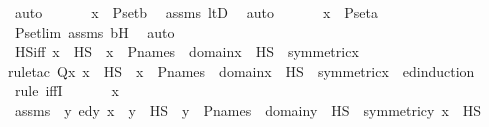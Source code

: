 \begin{isabellebody}
\ auto\ \isanewline
\ \ \isamarkupfalse%
\ \isamarkupfalse%
\ {\isachardoublequoteopen}x\ {\isasymin}\ P{\isacharunderscore}{\kern0pt}set{\isacharparenleft}{\kern0pt}b{\isacharparenright}{\kern0pt}{\isachardoublequoteclose}\ \isamarkupfalse%
\ assms\ ltD\ \isamarkupfalse%
\ auto\ \isanewline
\ \ \isamarkupfalse%
\ \isamarkupfalse%
\ {\isachardoublequoteopen}x\ {\isasymin}\ P{\isacharunderscore}{\kern0pt}set{\isacharparenleft}{\kern0pt}a{\isacharparenright}{\kern0pt}{\isachardoublequoteclose}\ \isamarkupfalse%
\ P{\isacharunderscore}{\kern0pt}set{\isacharunderscore}{\kern0pt}lim\ assms\ bH\ \isamarkupfalse%
\ auto\ \isanewline
{}\isamarkupfalse%
%
\endisatagproof
{\isafoldproof}%
%
\isadelimproof
\isanewline
%
\endisadelimproof
\isanewline
{}\isamarkupfalse%
\ HS{\isacharunderscore}{\kern0pt}iff{\isacharcolon}{\kern0pt}\ {\isachardoublequoteopen}x\ {\isasymin}\ HS\ {\isasymlongleftrightarrow}\ x\ {\isasymin}\ P{\isacharunderscore}{\kern0pt}names\ {\isasymand}\ domain{\isacharparenleft}{\kern0pt}x{\isacharparenright}{\kern0pt}\ {\isasymsubseteq}\ HS\ {\isasymand}\ symmetric{\isacharparenleft}{\kern0pt}x{\isacharparenright}{\kern0pt}{\isachardoublequoteclose}\ \isanewline
%
\isadelimproof
\ \ %
\endisadelimproof
%
\isatagproof
{}\isamarkupfalse%
{\isacharparenleft}{\kern0pt}rule{\isacharunderscore}{\kern0pt}tac\ Q{\isacharequal}{\kern0pt}{\isachardoublequoteopen}{\isasymlambda}x{\isachardot}{\kern0pt}\ x\ {\isasymin}\ HS\ {\isasymlongleftrightarrow}\ x\ {\isasymin}\ P{\isacharunderscore}{\kern0pt}names\ {\isasymand}\ domain{\isacharparenleft}{\kern0pt}x{\isacharparenright}{\kern0pt}\ {\isasymsubseteq}\ HS\ {\isasymand}\ symmetric{\isacharparenleft}{\kern0pt}x{\isacharparenright}{\kern0pt}{\isachardoublequoteclose}\ \ ed{\isacharunderscore}{\kern0pt}induction{\isacharparenright}{\kern0pt}\ \isanewline
\ \ \isamarkupfalse%
\ {\isacharparenleft}{\kern0pt}rule\ iffI{\isacharparenright}{\kern0pt}\isanewline
{}\isamarkupfalse%
\ {\isacharminus}{\kern0pt}\ \isanewline
\ \ \isamarkupfalse%
\ x\ \isamarkupfalse%
\ assms\ {\isacharcolon}{\kern0pt}\ {\isachardoublequoteopen}{\isacharparenleft}{\kern0pt}{\isasymAnd}y{\isachardot}{\kern0pt}\ ed{\isacharparenleft}{\kern0pt}y{\isacharcomma}{\kern0pt}\ x{\isacharparenright}{\kern0pt}\ {\isasymLongrightarrow}\ y\ {\isasymin}\ HS\ {\isasymlongleftrightarrow}\ y\ {\isasymin}\ P{\isacharunderscore}{\kern0pt}names\ {\isasymand}\ domain{\isacharparenleft}{\kern0pt}y{\isacharparenright}{\kern0pt}\ {\isasymsubseteq}\ HS\ {\isasymand}\ symmetric{\isacharparenleft}{\kern0pt}y{\isacharparenright}{\kern0pt}{\isacharparenright}{\kern0pt}{\isachardoublequoteclose}\ {\isachardoublequoteopen}x\ {\isasymin}\ HS{\isachardoublequoteclose}\isanewline

\end{isabellebody}
